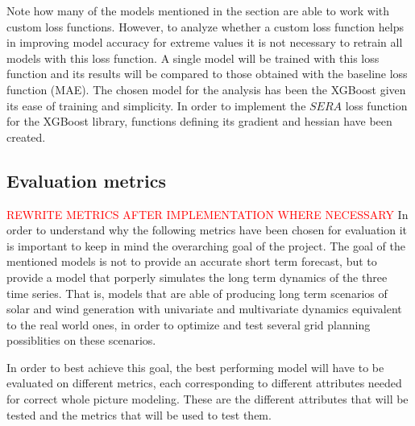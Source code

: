 Note how many of the models mentioned in the  section are able to work with custom loss functions. However, to analyze whether a custom loss function helps in improving model accuracy for extreme values it is not necessary to retrain all models with this loss function. A single model will be trained with this loss function and its results will be compared to those obtained with the baseline loss function (MAE). The chosen model for the analysis has been the XGBoost given its ease of training and simplicity. In order to implement the $SERA$ loss function for the XGBoost library, functions defining its gradient and hessian have been created.
\subsection{Evaluation metrics}
\label{s:evaluation-metrics}
\textcolor{red}{REWRITE METRICS AFTER IMPLEMENTATION WHERE NECESSARY}
In order to understand why the following metrics have been chosen for evaluation it is important to keep in mind the overarching goal of the project. The goal of the mentioned models is not to provide an accurate short term forecast, but to provide a model that porperly simulates the long term dynamics of the three time series. That is, models that are able of producing long term scenarios of solar and wind generation with univariate and multivariate dynamics equivalent to the real world ones, in order to optimize and test several grid planning possiblities on these scenarios. 

In order to best achieve this goal, the best performing model will have to be evaluated on different metrics, each corresponding to different attributes needed for correct whole picture modeling. These are the different attributes that will be tested and the metrics that will be used to test them. 

